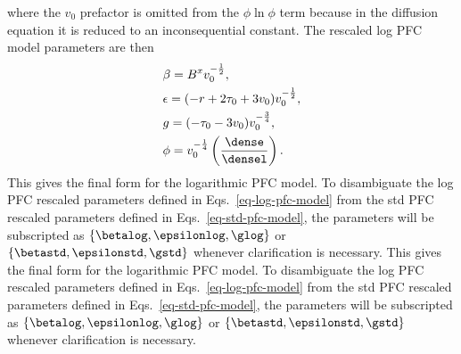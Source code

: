 %
where the $v_0$ prefactor is omitted from the $\phi \ln \phi$ term because in the diffusion equation it is reduced to an inconsequential constant.  The rescaled log PFC model parameters are then
%
\begin{subequations}\label{eq-log-pfc-model}
\begin{align}
& \beta = B^x v_0^{-\frac{1}{2}}, \label{eq-log-pfc-beta} \\
& \epsilon = (-r + 2 \tau_0 + 3 v_0) v_0^{-\frac{1}{2}}, \label{eq-log-pfc-epsilon} \\
& g = ( -\tau_0 - 3 v_0) v_0^{-\frac{3}{4}}, \label{eq-log-pfc-g} \\
& \phi = v_0^{-\frac{1}{4}} \left( \frac{\dense}{\densel} \right). \label{eq-log-pfc-phi}
\end{align}
\end{subequations}
%
This gives the final form for the logarithmic PFC model.  To disambiguate the log PFC rescaled parameters defined in Eqs.~\ref{eq-log-pfc-model} from the std PFC rescaled parameters defined in Eqs.~\ref{eq-std-pfc-model}, the parameters will be subscripted as $\{ \betalog, \epsilonlog, \glog \}$ or $\{ \betastd, \epsilonstd, \gstd \}$ whenever clarification is necessary.
This gives the final form for the logarithmic PFC model.  To disambiguate the log PFC rescaled parameters defined in Eqs.~\ref{eq-log-pfc-model} from the std PFC rescaled parameters defined in Eqs.~\ref{eq-std-pfc-model}, the parameters will be subscripted as $\{ \betalog, \epsilonlog, \glog \}$ or $\{ \betastd, \epsilonstd, \gstd \}$ whenever clarification is necessary.

